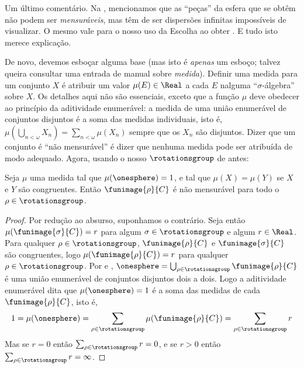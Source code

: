 \documentclass[../../../include/open-logic-section]{subfiles}
\begin{document}
Um último comentário. Na , mencionamos que as
``peças'' da esfera que se obtêm não podem ser \emph{mensuráveis},
mas têm de ser dispersões infinitas impossíveis de visualizar. O mesmo vale para o nosso
uso da Escolha ao obter . E tudo isto merece explicação.

De novo, devemos esboçar alguma base (mas isto é \emph{apenas} um
esboço; talvez queira consultar uma entrada de manual sobre \emph{medida}).
Definir uma medida para um conjunto $X$ é atribuir um valor $\mu(E) \in
\Real$ a cada $E$ nalguma ``$\sigma$-álgebra'' sobre $X$. Os detalhes aqui
não são essenciais, exceto que a função $\mu$ deve obedecer ao
princípio da aditividade enumerável: a medida de uma união enumerável de
conjuntos disjuntos é a soma das medidas individuais, isto é,
$\mu(\bigcup_{n < \omega} X_n) = \sum_{n < \omega}\mu(X_n)$ sempre que
os $X_n$ são disjuntos. Dizer que um conjunto é ``não mensurável'' é
dizer que nenhuma medida pode ser atribuída de modo adequado. Agora, usando o nosso
$\rotationsgroup$ de antes:

\begin{cor}[Vitali]
Seja $\mu$ uma medida tal que $\mu(\onesphere) = 1$, e tal que
$\mu(X) = \mu(Y)$ se $X$ e $Y$ são congruentes. Então
$\funimage{\rho}{C}$ é não mensurável para todo o $\rho \in
\rotationsgroup$. 
\end{cor}

\begin{proof}
Por redução ao absurso, suponhamos o contrário. Seja então $\mu(\funimage{\sigma}{C}) =
r$ para algum $\sigma \in \rotationsgroup$ e algum $r \in \Real$. Para
qualquer $\rho \in \rotationsgroup$, $\funimage{\rho}{C}$ e $\funimage{\sigma}{C}$ são
congruentes, logo  $\mu(\funimage{\rho}{C}) = r$ para qualquer $\rho \in
\rotationsgroup$. Por  e , $\onesphere =
\bigcup_{\rho \in \rotationsgroup}\funimage{\rho}{C}$ é uma união enumerável de conjuntos disjuntos dois a dois. Logo a aditividade enumerável dita que
$\mu(\onesphere) = 1$ é a soma das medidas de cada
$\funimage{\rho}{C}$, isto é,
\[
	1 = \mu(\onesphere) = \sum_{\rho \in \rotationsgroup}\mu(\funimage{\rho}{C}) = \sum_{\rho \in \rotationsgroup}r
\]
Mas se $r = 0$ então $\sum_{\rho \in \rotationsgroup}r = 0$, e se $r
> 0$ então $\sum_{\rho \in \rotationsgroup}r = \infty$. 
\end{proof}
\end{document}
